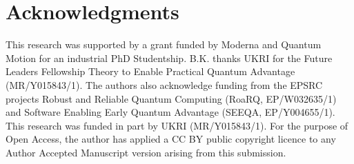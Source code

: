 \section{Acknowledgments}
This research was supported by a grant funded by Moderna and Quantum Motion for an industrial PhD Studentship.
B.K. thanks UKRI for the Future Leaders Fellowship Theory to Enable Practical Quantum Advantage (MR/Y015843/1).
The authors also acknowledge funding from the
EPSRC projects Robust and Reliable Quantum Computing (RoaRQ, EP/W032635/1)
and Software Enabling Early Quantum Advantage (SEEQA, EP/Y004655/1).
This research was funded in part by UKRI (MR/Y015843/1).
For the purpose of Open Access, the author has applied a CC BY public copyright licence
to any Author Accepted Manuscript version arising from this submission.